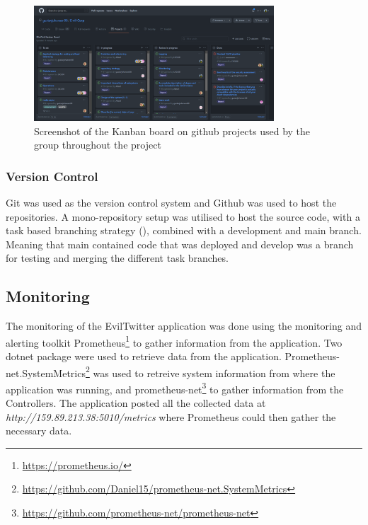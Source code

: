 \documentclass[report/main.tex]{subfiles}
\begin{document}
                \begin{figure}[H]
                    \centering
                    \includegraphics[width=0.8\textwidth]{report/images/Kanban board 1.png}
                    \caption{Screenshot of the Kanban board on github projects used by the group throughout the project}
                    \label{fig:kanban-board-1}
                \end{figure}

            \subsubsection{Version Control}
            \label{subsubsec:version-control}
                Git was used as the version control system and Github was used to host the repositories. A mono-repository setup was utilised to host the source code, with a task based branching strategy (\cite{task-branching}), combined with a development and main branch. Meaning that main contained code that was deployed and develop was a branch for testing and merging the different task branches.
                
        \subsection{Monitoring}
        \label{SubSec:monitoring}
            The monitoring of the EvilTwitter application was done using the monitoring and alerting toolkit Prometheus\footnote{\hyperlink{https://prometheus.io/}{https://prometheus.io/}} to gather information from the application. Two dotnet package were used to retrieve data from the application. Prometheus-net.SystemMetrics\footnote{\hyperlink{https://github.com/Daniel15/prometheus-net.SystemMetrics}{https://github.com/Daniel15/prometheus-net.SystemMetrics}} was used to retreive system information from where the application was running, and prometheus-net\footnote{\hyperlink{https://github.com/prometheus-net/prometheus-net}{https://github.com/prometheus-net/prometheus-net}} to gather information from the Controllers. The application posted all the collected data at \textit{http://159.89.213.38:5010/metrics} where Prometheus could then gather the necessary data.
                
\end{document}
